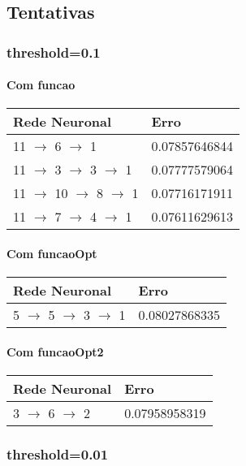 \documentclass{article}
\begin{document}
\subsection{Tentativas}

\subsubsection{threshold=0.1}

\paragraph{Com funcao}
\begin{center}
\begin{tabular}{ | l | l | }
\hline
Rede Neuronal & Erro\\ \hline
11 $\to$ 6 $\to$ 1 & 0.07857646844\\ \hline
11 $\to$ 3 $\to$ 3 $\to$ 1 & 0.07777579064\\ \hline
11 $\to$ 10 $\to$ 8 $\to$ 1 & 0.07716171911\\ \hline
11 $\to$ 7 $\to$ 4 $\to$ 1 & 0.07611629613\\ \hline
\end{tabular}
\end{center}

\paragraph{Com funcaoOpt}
\begin{center}
\begin{tabular}{ | l | l | }
\hline
Rede Neuronal & Erro\\ \hline
5 $\to$ 5 $\to$ 3 $\to$ 1 & 0.08027868335\\ \hline
\end{tabular}
\end{center}

\paragraph{Com funcaoOpt2}
\begin{center}
\begin{tabular}{ | l | l | }
\hline
Rede Neuronal & Erro\\ \hline
3 $\to$ 6 $\to$ 2 & 0.07958958319\\ \hline
\end{tabular}
\end{center}

\subsubsection{threshold=0.01}
\end{document}

